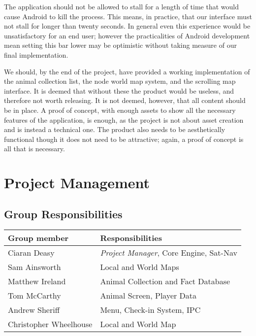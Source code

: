 \documentclass[12pt,a4paper,twoside]{article}
\begin{document}
The application should not be allowed to stall for a length of time that would cause Android to kill the process.
This means, in practice, that our interface must not stall for longer than twenty seconds.
In general even this experience would be unsatisfactory for an end user; however the practicalities of Android development mean setting this bar lower may be optimistic without taking measure of our final implementation.

We should, by the end of the project, have provided a working implementation of the animal collection list, the node world map system, and the scrolling map interface.
It is deemed that without these the product would be useless, and therefore not worth releasing.
It is not deemed, however, that all content should be in place.
A proof of concept, with enough assets to show all the necessary features of the application, is enough, as the project is not about asset creation and is instead a technical one.
The product also needs to be aesthetically functional though it does not need to be attractive; again, a proof of concept is all that is necessary.

\section{Project Management}
\subsection{Group Responsibilities}
\setlength{\extrarowheight}{5pt}
\begin{tabular}{|m{5.5cm}|m{9.5cm}|}
\hline
\textbf{Group member} & \textbf{Responsibilities}\\
\hline
Ciaran Deasy           & \emph{Project Manager}, Core Engine, Sat-Nav\\
\hline
Sam Ainsworth          & Local and World Maps\\
\hline
Matthew Ireland        & Animal Collection and Fact Database\\
\hline
Tom McCarthy           & Animal Screen, Player Data\\
\hline
Andrew Sheriff         & Menu, Check-in System, IPC\\
\hline
Christopher Wheelhouse & Local and World Map\\
\hline
\end{tabular}
\end{document}
